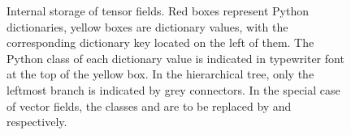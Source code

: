 \begin{figure}
\begin{center}

\end{center}
\caption{\label{f:vec:storage_tensor} \footnotesize
Internal storage of tensor fields. Red boxes
represent Python dictionaries, yellow boxes are dictionary values, with the corresponding
dictionary key located on the left of them.
The Python class of each dictionary value is indicated in typewriter font at the top of the
yellow box. In the hierarchical tree, only the leftmost
branch is indicated by grey connectors. In the special case of vector fields, the classes
 and  are to be replaced by  and  respectively.}
\end{figure}

